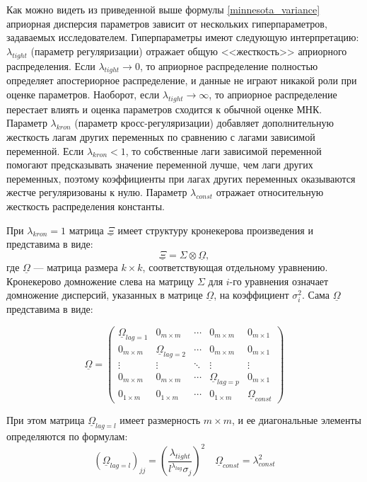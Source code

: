 \documentclass[11pt]{article} %
\newcommand{\prior}{\underline}
\begin{document}
Как можно видеть из приведенной выше формулы \eqref{minnesota_variance} априорная дисперсия параметров зависит от нескольких гиперпараметров, задаваемых исследователем. Гиперпараметры имеют следующую интерпретацию: $\lambda_{tight}$ (параметр регуляризации) отражает общую <<жесткость>> априорного распределения. Если $\lambda_{tight}\to 0$, то априорное распределение полностью определяет апостериорное распределение, и данные не играют никакой роли при оценке параметров. Наоборот, если $\lambda_{tight}\to \infty$, то априорное распределение перестает влиять и оценка параметров сходится к обычной оценке МНК. Параметр $\lambda_{kron}$ (параметр кросс-регуляризации) добавляет дополнительную жесткость лагам других переменных по сравнению с лагами зависимой переменной. Если  $\lambda_{kron}<1$, то собственные лаги зависимой переменной помогают предсказывать значение переменной лучше, чем лаги других переменных, поэтому коэффициенты при лагах других переменных оказываются жестче регуляризованы к нулю.   Параметр $\lambda_{const}$ отражает относительную жесткость распределения константы.

При $\lambda_{kron}=1$ матрица $\prior \Xi$ имеет структуру кронекерова произведения и представима в виде:
\[
\prior \Xi = \Sigma \otimes \prior \Omega,
\]
где $\prior \Omega$ --- матрица размера $k\times k$, соответствующая отдельному уравнению. Кронекерово домножение слева на матрицу $\Sigma$ для $i$-го уравнения означает домножение дисперсий, указанных в матрице $\prior \Omega$, на коэффициент $\sigma^2_i$. Сама  $\prior \Omega$ представима в виде: 


\begin{equation}
\prior \Omega=\begin{pmatrix} \label{prior_omega1}
\prior \Omega_{lag=1}&0_{m\times m}&\cdots&0_{m\times m}&0_{m\times 1}\\
0_{m\times m}& \prior\Omega_{lag=2}& \cdots &0_{m\times m}&0_{m\times 1}\\
\vdots &\vdots& \ddots&\vdots& \vdots\\
0_{m\times m}&0_{m\times m}&\cdots&\prior\Omega_{lag=p} & 0_{m\times 1}\\
0_{1\times m}&0_{1\times m}&\cdots&0_{1\times m}&\prior \Omega_{const}
\end{pmatrix} 
\end{equation}

При этом матрица $\prior \Omega_{lag=l}$ имеет размерность $m\times m$, и ее диагональные элементы определяются по формулам:
\begin{equation}
(\prior \Omega_{lag=l})_{jj} \label{prior_omega2}
=\left(\frac{\lambda_{tight}}{l^{\lambda_{lag}}\sigma_j}\right)^2
\quad
\prior \Omega_{const}=\lambda_{const}^2 
\end{equation} 
\end{document}
